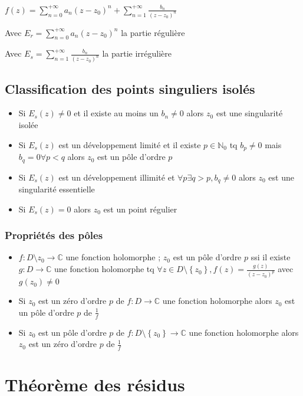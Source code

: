\documentclass[a4paper,10pt]{report}
\newcommand{\ap}{\rightarrow}
\newcommand{\C}{\mathbb{C}}
\newcommand{\N}{\mathbb{N}}
\newcommand{\tset}[1]{\left\lbrace #1 \right\rbrace}
\begin{document}
$f(z) = \sum_{n=0}^{+\infty} a_n(z-z_0)^n + \sum_{n=1}^{+\infty} \frac{b_n}{(z-z_0)^n}$

Avec $E_r = \sum_{n=0}^{+\infty} a_n(z-z_0)^n$ la partie régulière

Avec $E_s = \sum_{n=1}^{+\infty} \frac{b_n}{(z-z_0)^n}$ la partie irrégulière

\section{Classification des points singuliers isolés}

\begin{itemize}
  \item{Si $E_s(z) \neq 0$ et il existe au moins un $b_n \neq 0$ alors $z_0$
    est une singularité isolée}
  \item{Si $E_s(z)$ est un développement limité et il existe $p \in \N_0$
    tq $b_p \neq 0$ mais $b_q = 0 \forall p < q$ alors $z_0$ est un pôle
    d'ordre $p$}
  \item{Si $E_s(z)$ est un développement illimité et $\forall p \exists q >
    p, b_q \neq 0$ alors $z_0$ est une singularité essentielle}
  \item{Si $E_s(z) = 0$ alors $z_0$ est un point régulier}
\end{itemize}

\subsection{Propriétés des pôles}

\begin{itemize}
  \item{$f : D\setminus{z_0} \ap \C$ une fonction holomorphe ; $z_0$ est un
    pôle d'ordre $p$ ssi il existe $g: D \ap \C$ une fonction holomorphe
    tq $\forall z \in D\setminus\tset{z_0}, f(z) = \frac{g(z)}{(z-z_0)^p}$
    avec $g(z_0) \neq 0$}
  \item{Si $z_0$ est un zéro d'ordre $p$ de $f: D \ap \C$ une fonction
    holomorphe alors $z_0$ est un pôle d'ordre $p$ de $\frac{1}{f}$}
  \item{Si $z_0$ est un pôle d'ordre $p$ de $f: D \setminus\tset{z_0}
    \ap \C$ une fonction holomorphe alors $z_0$ est un zéro d'ordre $p$
    de $\frac{1}{f}$}
\end{itemize}

\chapter{Théorème des résidus}
\end{document}
